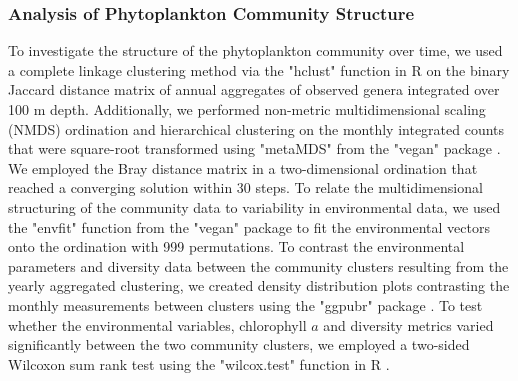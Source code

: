 \documentclass[draft]{agujournal2019}
\begin{document}
    \subsubsection{Analysis of Phytoplankton Community Structure}
    To investigate the structure of the phytoplankton community over time, we used a complete linkage clustering method via the "hclust" function in R \cite{r_core_team_r_2024} on the binary Jaccard distance matrix of annual aggregates of observed genera integrated over 100 m depth. Additionally, we performed non-metric multidimensional scaling (NMDS) ordination and hierarchical clustering on the monthly integrated counts that were square-root transformed using "metaMDS" from the "vegan" package \cite{oksanen_vegan_2024}. We employed the Bray distance matrix in a two-dimensional ordination that reached a converging solution within 30 steps. To relate the multidimensional structuring of the community data to variability in environmental data, we used the "envfit" function from the "vegan" package to fit the environmental vectors onto the ordination with 999 permutations. 
    To contrast the environmental parameters and diversity data between the community clusters resulting from the yearly aggregated clustering, we created density distribution plots contrasting the monthly measurements between clusters using the "ggpubr" package \cite{kassambara_ggpubr_2023}. To test whether the environmental variables, chlorophyll $a$ and diversity metrics varied significantly between the two community clusters, we employed a two-sided Wilcoxon sum rank test using the "wilcox.test" function in R \cite{r_core_team_r_2024}.

        
\end{document}
